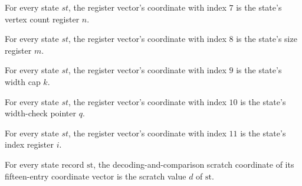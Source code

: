 \begin{lemma}
\label{Complexity.PathHard.St.toV_n}
\leanok
{}
For every state $st$, the register vector’s coordinate with index $7$ is the state’s
vertex count register $n$.
\end{lemma}

\begin{lemma}
\label{Complexity.PathHard.St.toV_m}
\leanok
{}
For every state $st$, the register vector’s coordinate with index $8$ is the state’s
size register $m$.
\end{lemma}

\begin{lemma}
\label{Complexity.PathHard.St.toV_k}
\leanok
{}
For every state $st$, the register vector’s coordinate with index $9$ is the state’s
width cap $k$.
\end{lemma}

\begin{lemma}
\label{Complexity.PathHard.St.toV_q}
\leanok
{}
For every state $st$, the register vector’s coordinate with index $10$ is the state’s
width-check pointer $q$.
\end{lemma}

\begin{lemma}
\label{Complexity.PathHard.St.toV_i}
\leanok
{}
For every state $st$, the register vector’s coordinate with index $11$ is the state’s
index register $i$.
\end{lemma}

\begin{lemma}
\label{Complexity.PathHard.St.toV_d}
\leanok
{}
For every state record $\mathrm{st}$, the decoding-and-comparison scratch coordinate of
its fifteen-entry coordinate vector is the scratch value $d$ of $\mathrm{st}$.
\end{lemma}

